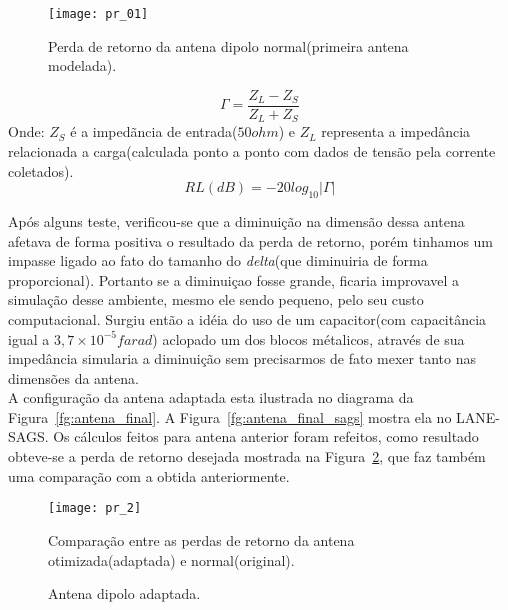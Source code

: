 \begin{figure}[ht!]
	\centering
	\texttt{[image: pr\_01]}
	\caption{Perda de retorno da antena dipolo normal(primeira antena modelada).}
	\label{fg:pr_01}
\end{figure}

\begin{equation}\label{eq:impedancia}
	\Gamma = \frac{Z_{L} - Z_{S}}{Z_{L} + Z_{S}}
\end{equation}
	Onde: $Z_{S}$ é a impedãncia de entrada($50 ohm$) e $Z_{L}$ representa a impedância relacionada a carga(calculada ponto a ponto com dados de tensão pela corrente coletados).
\begin{equation}\label{eq:pr}
	RL(dB) = -20log_{10} |\Gamma|
\end{equation}

Após alguns teste, verificou-se que a diminuição na dimensão dessa antena afetava de forma positiva o resultado da perda de retorno, porém tinhamos um impasse ligado ao fato do tamanho do \textit{delta}(que diminuiria de forma proporcional). Portanto se a diminuiçao fosse grande, ficaria improvavel a simulação desse ambiente, mesmo ele sendo pequeno, pelo seu custo computacional. Surgiu então a idéia do uso de um capacitor(com capacitância igual a $3,7\times10^{-5} farad$) aclopado um dos blocos métalicos, através de sua impedância simularia a diminuição sem precisarmos de fato mexer tanto nas dimensões da antena.\\

A configuração da antena adaptada esta ilustrada no diagrama da Figura~\ref{fg:antena_final}. A Figura~\ref{fg:antena_final_sags} mostra ela no LANE-SAGS. Os cálculos feitos para antena anterior foram refeitos, como resultado obteve-se a perda de retorno desejada mostrada na Figura~\ref{fg:pr_2}, que faz também uma comparação com a obtida anteriormente.\\

\begin{figure}[ht!]
	\centering
	\texttt{[image: pr\_2]}
	\caption{Comparação entre as perdas de retorno da antena otimizada(adaptada) e normal(original).}
	\label{fg:pr_2}
\end{figure}

\begin{figure}[ht!]
	\begin{center}
\qquad
	\end{center}
	\caption{Antena dipolo adaptada.}
	\label{fg:antena_apatada}
\end{figure}

